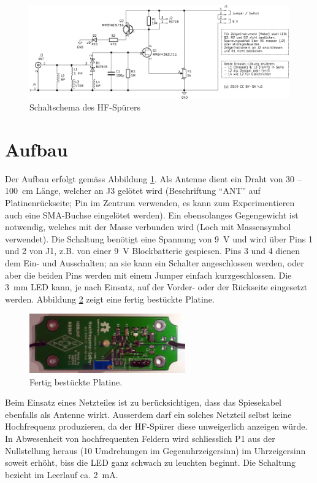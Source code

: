 \documentclass[a4paper,11pt,halfparskip,smallheadings,DIV=10]{scrartcl}
\begin{document}
\begin{figure}
\includegraphics[width=\textwidth]{schaltung.pdf}
\caption{Schaltschema des HF-Spürers}
\label{fig:schematic}
\end{figure}

\section{Aufbau}
Der Aufbau erfolgt gemäss Abbildung \ref{fig:schematic}. Als Antenne dient ein
Draht von 30 -- 100~cm Länge, welcher an J3 gelötet wird (Beschriftung ``ANT''
auf Platinenrückseite; Pin im Zentrum verwenden, es kann zum Experimentieren
auch eine SMA-Buchse eingelötet werden).
Ein ebensolanges Gegengewicht ist notwendig, welches mit der Masse
verbunden wird (Loch mit Massensymbol verwendet). Die Schaltung benötigt eine Spannung von
9~V und wird über Pins 1 und 2 von J1, z.B. von einer 9~V Blockbatterie
gespiesen. Pins 3 und 4 dienen dem Ein- und Ausschalten; an sie kann ein Schalter
angeschlossen werden, oder aber die beiden Pins werden mit einem Jumper einfach
kurzgeschlossen. Die 3~mm LED kann, je nach Einsatz, auf der Vorder- oder der
Rückseite eingesetzt werden.  Abbildung \ref{fig:aufbau} zeigt eine fertig
bestückte Platine.

\begin{figure}[H]
    \begin{center}\includegraphics[width=0.6\textwidth]{foto.png}\end{center}
\caption{Fertig bestückte Platine.}
\label{fig:aufbau}
\end{figure}

Beim Einsatz eines
Netzteiles ist zu berücksichtigen, dass das Spiesekabel ebenfalls als Antenne
wirkt. Ausserdem darf ein solches Netzteil selbst keine Hochfrequenz produzieren,
da der HF-Spürer diese unweigerlich anzeigen würde. In Abwesenheit von
hochfrequenten Feldern wird schliesslich P1 aus der Nullstellung heraus (10 
Umdrehungen im Gegenuhrzeigersinn) im Uhrzeigersinn soweit erhöht, biss die LED
ganz schwach zu leuchten beginnt. Die Schaltung bezieht im Leerlauf ca. 2~mA.
\end{document}
